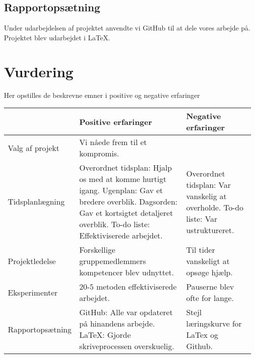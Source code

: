 \subsection{Rapportopsætning}
Under udarbejdelsen af projektet anvendte vi GitHub til at dele vores arbejde på. Projektet blev udarbejdet i LaTeX. 

\section{Vurdering}
Her opstilles de beskrevne emner i positive og negative erfaringer


\begin{table}[h]
	\begin{tabular}{|l|p{5cm}|p{5cm}|}
		\hline
		&\textbf{Positive erfaringer}&\textbf{Negative erfaringer}\\ \hline
		Valg af projekt  & Vi nåede frem til et kompromis.& \\ \hline  
		Tidsplanlægning  & Overordnet tidsplan: Hjalp os med at komme hurtigt igang.\newline
		Ugenplan: Gav et bredere overblik.\newline
		Dagsorden: Gav et kortsigtet detaljeret overblik.\newline
		To-do liste: Effektiviserede arbejdet. & Overordnet tidsplan: Var vanskelig at overholde. \newline 
		To-do liste: Var ustruktureret. \\ \hline
		Projektledelse   & Forskellige gruppemedlemmers kompetencer blev udnyttet. & Til tider vanskeligt at opsøge hjælp. \\ \hline
		Eksperimenter    & $20$-$5$ metoden effektiviserede arbejdet. & Pauserne blev ofte for lange. \\ \hline
		Rapportopsætning & GitHub: Alle var opdateret på hinandens arbejde.\newline
		LaTeX: Gjorde skriveprocessen overskuelig. & Stejl læringskurve for LaTex og Github.\\ \hline
     
	\end{tabular}
\end{table}




